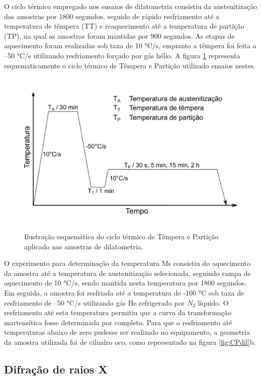 O ciclo térmico empregado nos ensaios de dilatometria consistiu da austenitização das amostras por 1800 segundos, seguido de rápido resfriamento até a temperatura de têmpera (TT) e reaquecimento até a temperatura de partição (TP), na qual as amostras foram mantidas por 900 segundos. As etapas de aquecimento foram realizadas sob taxa de 10 °C/s, enquanto a têmpera foi feita a --50 °C/s utilizando resfriamento forçado por gás hélio. A figura \ref{fig:expDil} representa esquematicamente o ciclo térmico de Têmpera e Partição utilizado ensaios nestes.

\begin{figure}
	\includegraphics[height=8cm]{img/expproc_dil.pdf}
	\caption{Ilustração esquemática do ciclo térmico de Têmpera e Partição aplicado nas amostras de dilatometria.}
	\label{fig:expDil}
\end{figure}

O experimento para determinação da temperatura Ms consistiu do aquecimento da amostra até a temperatura de austenitização selecionada, seguindo rampa de aquecimento de 10 °C/s, sendo mantida nesta temperatura por 1800 segundos. Em seguida, a amostra foi resfriada até a temperatura de -100 °C sob taxa de resfriamento de --50 °C/s utilizando gás He refrigerado por $N_2$ líquido. O resfriamento até esta temperatura permitiu que a curva da transformação martensítica fosse determinada por completo. Para que o resfriamento até temperaturas abaixo de zero pudesse ser realizado no equipamento, a geometria da amostra utilizada foi de cilindro oco, como representado na figura \ref{fig:CPdil}b.

\subsection{Difra\c{c}\~{a}o de raios X }

